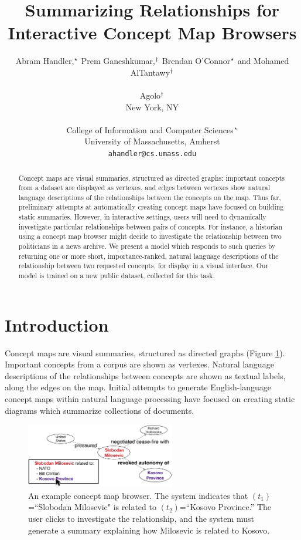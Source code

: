 \documentclass[11pt,a4paper]{article}
\title{Summarizing Relationships for Interactive Concept Map Browsers}
\author{Abram Handler,$^{\star}$ Prem Ganeshkumar,$^{\dagger}$ Brendan O'Connor$^{\star}$ and Mohamed AlTantawy$^{\dagger}$ \\ \\
Agolo$^{\dagger}$ \\ 
 New York, NY \\ \\
  College of Information and Computer Sciences$^{\star}$ \\
  University of Massachusetts, Amherst \\
  {\tt ahandler@cs.umass.edu} \\}
\date{}
\begin{document}
\maketitle



\maketitle\begin{abstract}
Concept maps are visual summaries, structured as directed graphs: important concepts from a dataset are displayed as vertexes, and edges between vertexes show natural language descriptions of the relationships between the concepts on the map. Thus far, preliminary attempts at automatically creating concept maps have focused on building static summaries. However, in interactive settings, users will need to dynamically investigate particular relationships between pairs of concepts. For instance, a historian using a concept map browser might decide to investigate the relationship between two politicians in a news archive. We present a model which responds to such queries by returning one or more short, importance-ranked, natural language descriptions of the relationship between two requested concepts, for display in a visual interface. Our model is trained on a new public dataset, collected for this task.
\end{abstract}


\section{Introduction}

Concept maps are visual summaries, structured as directed graphs (Figure \ref{f:map}). Important concepts from a corpus are shown as vertexes. Natural language descriptions of the relationships between concepts are shown as textual labels, along the edges on the map. Initial attempts to generate English-language concept maps within natural language processing \cite{emnlp2017conceptmaps} have focused on creating static diagrams which summarize collections of documents.

\begin{figure}[htb!]
\centering
\includegraphics[width=6.5cm]{simple.pdf}
\caption{An example concept map browser. The system indicates that $(t_1)$=``Slobodan Milosevic" is related to $(t_2)$=``Kosovo Province.'' The user clicks to investigate the relationship, and the system must generate a summary explaining how Milosevic is related to Kosovo.}
\label{f:map}
\end{figure}
\end{document}
